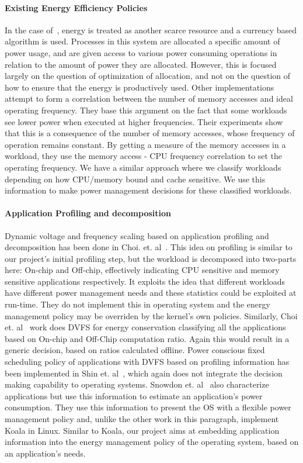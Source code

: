 \paragraph{Existing Energy Efficiency Policies} In the case of~\cite{ecos}, energy is treated as another scarce resource and a currency based algorithm is used. 
Processes in this system are allocated a specific amount of power usage, and are given access to various power consuming operations in relation to the amount 
of power they are allocated. However, this is focused largely on the question of optimization of allocation, and not on the question of how to ensure that the energy is productively used.
Other implementations~\cite{and-dvfs, decomp} attempt to form a correlation between the number of memory accesses and ideal operating frequency. They base this 
argument on the fact that some workloads see lower power when executed at higher frequencies. Their experiments show that this is a consequence of the 
number of memory accesses, whose frequency of operation remains constant. By getting a measure of the memory accesses in a workload, 
they use the memory access - CPU frequency correlation to set the operating frequency.
We have a similar approach where we classify workloads depending on how CPU/memory bound and cache sensitive. 
We use this information to make power management decisions for these classified workloads. 

\paragraph{Application Profiling and decomposition} Dynamic voltage and frequency scaling based on application profiling and 
decomposition has been done in Choi. et. al~\cite{decomp}. This idea on profiling is similar to our project’s initial profiling step, but the workload 
is decomposed into two-parts here: On-chip and Off-chip, effectively indicating CPU sensitive and memory sensitive applications respectively. 
It exploits the idea that different workloads have different power management needs and these statistics could be exploited 
at run-time. They do not implement this in operating system and the energy management policy  
may be overriden by the kernel's own policies. Similarly, Choi et. al~\cite{choi2005fine} work does DVFS for energy conservation 
classifying all the applications based on On-chip and Off-Chip computation ratio. Again this would result in a generic decision, based on ratios calculated offline. 
Power conscious fixed scheduling policy of applications with DVFS based on profiling information has been implemented in Shin et. al~\cite{shin1999power}, 
which again does not integrate the decision making capability to operating systems. 
Snowdon et. al~\cite{snowdon2009koala} also characterize applications but use this information to estimate an application's power consumption. 
They use this information to present the OS with a flexible power management policy and, unlike the other work in this paragraph, implement Koala in Linux.
Similar to Koala, our project aims at embedding application information into the energy management policy of the operating system, based on an application's needs. 
